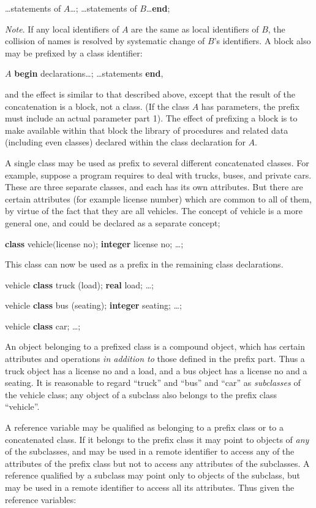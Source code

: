 \tabto*{5.9em}\dots statements of $A$\dots; \dots statements of $B$\dots \textbf{end};

\textit{Note}. If any local identifiers of $A$ are the same as local identifiers of $B$, the collision of names is resolved by systematic change of $B$'s identifiers. A block also may be prefixed by a class identifier:

\quad $A$ \textbf{begin} declarations\dots; \dots statements \textbf{end},

\noindent
and the effect is similar to that described above, except that the result of the concatenation is a block, not a class. (If the class $A$ has parameters, the prefix must include an actual parameter part 1). The effect of prefixing a block is to make available within that block the library of procedures and related data (including even classes) declared within the class declaration for $A$.

A single class may be used as prefix to several different concatenated classes. For example, suppose a program requires to deal with trucks, buses, and private cars. These are three separate classes, and each has its own attributes. But there are certain attributes (for example license number) which are common to all of them, by virtue of the fact that they are all vehicles. The concept of vehicle is a more general one, and could be declared as a separate concept;

\quad \textbf{class} vehicle$($license no$)$; \textbf{integer} license no; \dots;

\noindent
This class can now be used as a prefix in the remaining class declarations.

\quad vehicle \textbf{class} truck (load); \textbf{real} load; \dots;

\quad vehicle \textbf{class} bus (seating); \textbf{integer} seating; \dots;

\quad vehicle \textbf{class} car; \dots;

An object belonging to a prefixed class is a compound object, which has certain attributes and operations \textit{in addition to} those defined in the prefix part. Thus a truck object has a license no and a load, and a bus object has a license no and a seating. It is reasonable to regard ``truck'' and ``bus'' and ``car'' as \textit{subclasses} of the vehicle class; any object of a subclass also belongs to the prefix class ``vehicle''.

A reference variable may be qualified as belonging to a prefix class or to a concatenated class. If it belongs to the prefix class it may point to objects of \textit{any} of the subclasses, and may be used in a remote identifier to access any of the attributes of the prefix class but not to access any attributes of the subclasses. A reference qualified by a subclass may point only to objects of the subclass, but may be used in a remote identifier to access all its attributes. Thus given the reference variables:


